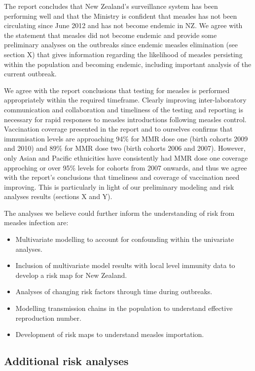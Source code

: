 \documentclass{article}
\begin{document}
The report concludes that New Zealand's surveillance system has been performing well and that the Ministry is confident that measles has not been circulating since June 2012 and has not become endemic in NZ. We agree with the statement that measles did not become endemic and provide some preliminary analyses on the outbreaks since endemic measles elimination (see section X) that gives information regarding the likelihood of measles persisting within the population and becoming endemic, including important analysis of the current outbreak.

We agree with the report conclusions that testing for measles is performed appropriately within the required timeframe. Clearly improving inter-laboratory communication and collaboration and timeliness of the testing and reporting is necessary for rapid responses to measles introductions following measles control. Vaccination coverage presented in the report and to ourselves confirms that immunisation levels are approaching 94\% for MMR dose one (birth cohorts 2009 and 2010) and 89\% for MMR dose two (birth cohorts 2006 and 2007). However, only Asian and Pacific ethnicities have consistently had MMR dose one coverage approching or over 95\% levels for cohorts from 2007 onwards, and thus we agree with the report's conclusions that timeliness and coverage of vaccination need improving. This is particularly in light of our preliminary modeling and risk analyses results (sections X and Y).

The analyses we believe could further inform the understanding of risk from measles infection are:
\begin{itemize}
\item Multivariate modelling to account for confounding within the univariate analyses.
\item Inclusion of multivariate model results with local level immunity data to develop a risk map for New Zealand.
\item Analyses of changing risk factors through time during outbreaks.
\item Modelling transmission chains in the population to understand effective reproduction number.
\item Development of risk maps to understand measles importation.
\end{itemize}

\subsection{Additional risk analyses}
\end{document}
